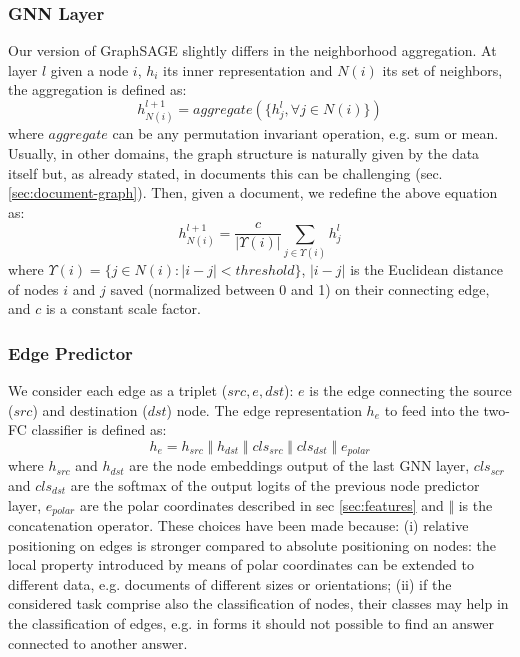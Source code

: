 \documentclass[runningheads]{llncs}
\begin{document}
\subsubsection{GNN Layer}
\label{sec:gnn}
Our version of GraphSAGE slightly differs in the neighborhood aggregation. At layer $l$ given a node $i$, $h_i$ its inner representation and $N(i)$ its set of neighbors, the aggregation is defined as:
\begin{equation}
    h_{N(i)}^{l+1} = aggregate(\{h^{l}_{j}, \forall j \in N(i) \})
\end{equation}
where $aggregate$ can be any permutation invariant operation, e.g. sum or mean.
Usually, in other domains, the graph structure is naturally given by the data itself but, as already stated, in documents this can be challenging (sec. \ref{sec:document-graph}). Then, given a document, we redefine the above equation as:
\begin{equation}
\label{eq:graph-sage}
    h_{N(i)}^{l+1} = \frac{c}{|\Upsilon(i)|} \sum_{j \in \Upsilon(i)} h^{l}_{j}
\end{equation}
where $\Upsilon(i) = \{j \in N(i): |i - j| < threshold\}$, $|i - j|$ is the Euclidean distance of nodes $i$ and $j$ saved (normalized between 0 and 1) on their connecting edge, and $c$ is a constant scale factor.

\subsubsection{Edge Predictor}
\label{sec:edge-predictor}
We consider each edge as a triplet ($src, e, dst$): $e$ is the edge connecting the source ($src$) and destination ($dst$) node. 
The edge representation $h_e$ to feed into the two-FC classifier is defined as:
\begin{equation}
\label{eq:edges}
    h_e = h_{src}\;\Vert\;h_{dst}\;\Vert\;cls_{src}\;\Vert\;cls_{dst}\;\Vert\;e_{polar}
\end{equation}
where $h_{src}$ and $h_{dst}$ are the node embeddings output of the last GNN layer, $cls_{scr}$ and $cls_{dst}$ are the softmax of the output logits of the previous node predictor layer, $e_{polar}$ are the polar coordinates described in sec \ref{sec:features} and $\Vert$ is the concatenation operator. These choices have been made because: (i) relative positioning on edges is stronger compared to absolute positioning on nodes: the local property introduced by means of polar coordinates can be extended to different data, e.g. documents of different sizes or orientations; (ii) if the considered task comprise also the classification of nodes, their classes may help in the classification of edges, e.g. in forms it should not possible to find an answer connected to another answer. 
\end{document}
